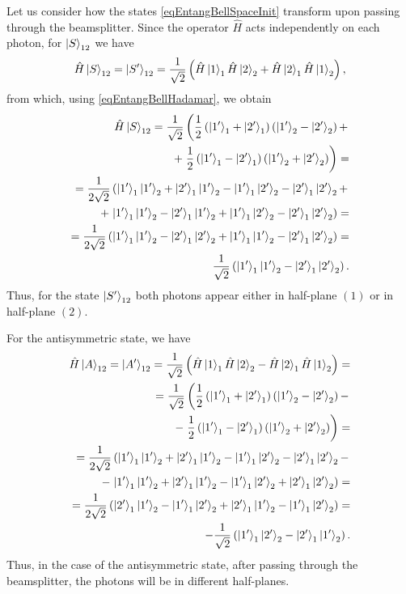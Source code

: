 


Let us consider how the states \eqref{eqEntangBellSpaceInit}
transform upon passing through the beamsplitter. Since the operator
$\hat{H}$ acts independently on each photon, for
$\ket{S}_{12}$ we have 
\begin{equation}
\hat{H}\ket{S}_{12} = \ket{S'}_{12} = 
\frac{1}{\sqrt{2}}
\left(
\hat{H}\ket{1}_1\hat{H}\ket{2}_2 +
\hat{H}\ket{2}_1\hat{H}\ket{1}_2
\right),
\nonumber 
\end{equation}
from which, using \eqref{eqEntangBellHadamar}, we obtain
\begin{eqnarray}
\hat{H}\ket{S}_{12} =
\frac{1}{\sqrt{2}}
\left(
\frac{1}{2}
\left(\ket{1'}_1 +
\ket{2'}_1\right)
\left(\ket{1'}_2 -
\ket{2'}_2\right) +
\right.
\nonumber \\
+ \left.
\frac{1}{2}
\left(\ket{1'}_1 -
\ket{2'}_1\right)
\left(\ket{1'}_2 +
\ket{2'}_2\right)
\right) = 
\nonumber \\
=
\frac{1}{2 \sqrt{2}}
\left(
\ket{1'}_1 \ket{1'}_2 +
\ket{2'}_1 \ket{1'}_2 -
\ket{1'}_1 \ket{2'}_2 -
\ket{2'}_1 \ket{2'}_2 +
\right. 
\nonumber \\
+ \left.
\ket{1'}_1 \ket{1'}_2 -
\ket{2'}_1 \ket{1'}_2 +
\ket{1'}_1 \ket{2'}_2 -
\ket{2'}_1 \ket{2'}_2
\right) =
\nonumber \\
=
\frac{1}{2 \sqrt{2}}
\left(
\ket{1'}_1 \ket{1'}_2 
- \ket{2'}_1 \ket{2'}_2 
+ \ket{1'}_1 \ket{1'}_2 
- \ket{2'}_1 \ket{2'}_2
\right) = 
\nonumber \\
\frac{1}{\sqrt{2}}
\left(
\ket{1'}_1 \ket{1'}_2 
- \ket{2'}_1 \ket{2'}_2 
\right).
\nonumber
\end{eqnarray}
Thus, for the state $\ket{S'}_{12}$ both photons appear
either in half-plane $\left(1\right)$ or in half-plane
$\left(2\right)$. 

For the antisymmetric state, we have
\begin{eqnarray}
\hat{H}\ket{A}_{12} = \ket{A'}_{12} = 
\frac{1}{\sqrt{2}}
\left(
\hat{H}\ket{1}_1\hat{H}\ket{2}_2 -
\hat{H}\ket{2}_1\hat{H}\ket{1}_2
\right) = 
\nonumber \\
=
\frac{1}{\sqrt{2}}
\left(
\frac{1}{2}
\left(\ket{1'}_1 +
\ket{2'}_1\right)
\left(\ket{1'}_2 -
\ket{2'}_2\right) -
\right.
\nonumber \\
- \left.
\frac{1}{2}
\left(\ket{1'}_1 -
\ket{2'}_1\right)
\left(\ket{1'}_2 +
\ket{2'}_2\right)
\right) = 
\nonumber \\
=
\frac{1}{2 \sqrt{2}}
\left(
\ket{1'}_1 \ket{1'}_2 +
\ket{2'}_1 \ket{1'}_2 -
\ket{1'}_1 \ket{2'}_2 -
\ket{2'}_1 \ket{2'}_2 -
\right. 
\nonumber \\
- \left.
\ket{1'}_1 \ket{1'}_2 +
\ket{2'}_1 \ket{1'}_2 -
\ket{1'}_1 \ket{2'}_2 +
\ket{2'}_1 \ket{2'}_2
\right) =
\nonumber \\
=
\frac{1}{2 \sqrt{2}}
\left(
\ket{2'}_1 \ket{1'}_2 
- \ket{1'}_1 \ket{2'}_2 
+ \ket{2'}_1 \ket{1'}_2 
- \ket{1'}_1 \ket{2'}_2
\right) = 
\nonumber \\
- \frac{1}{\sqrt{2}}
\left(
\ket{1'}_1 \ket{2'}_2 
- \ket{2'}_1 \ket{1'}_2 
\right).
\nonumber
\end{eqnarray}
Thus, in the case of the antisymmetric state, after passing
through the beamsplitter, the photons will be in different half-planes.


